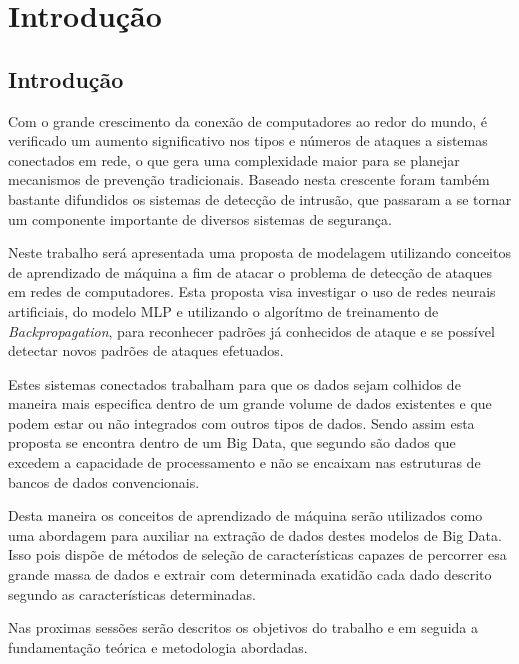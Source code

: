 \part{Introdução}
\chapter[Introdução]{Introdução}

Com o grande crescimento da conexão de computadores ao redor do mundo, é verificado um aumento significativo nos tipos e números de ataques a sistemas conectados em rede, o que gera uma complexidade maior para se planejar mecanismos de prevenção tradicionais. Baseado nesta crescente foram também bastante difundidos os sistemas de detecção de intrusão, que passaram a se tornar um componente importante de diversos sistemas de segurança.

Neste trabalho será apresentada uma proposta de modelagem utilizando conceitos de aprendizado de máquina a fim de atacar o problema de detecção de ataques em redes de computadores. Esta proposta visa investigar o uso de redes neurais artificiais, do modelo MLP e utilizando o algorítmo de treinamento de \textit{Backpropagation}, para reconhecer padrões já conhecidos de ataque e se possível detectar novos padrões de ataques efetuados.

Estes sistemas conectados trabalham para que os dados sejam colhidos de maneira mais especifica dentro de um grande volume de dados existentes e que podem estar ou não integrados com outros tipos de dados. Sendo assim esta proposta se encontra dentro de um Big Data, que segundo \cite{Dumbill2012} são dados que excedem a capacidade de processamento e não se encaixam nas estruturas de bancos de dados convencionais.

Desta maneira os conceitos de aprendizado de máquina serão utilizados como uma abordagem para auxiliar na extração de dados destes modelos de Big Data. Isso pois dispõe de métodos de seleção de características capazes de percorrer esa grande massa de dados e extrair com determinada exatidão cada dado descrito segundo as características determinadas.

Nas proximas sessões serão descritos os objetivos do trabalho e em seguida a fundamentação teórica e metodologia abordadas.